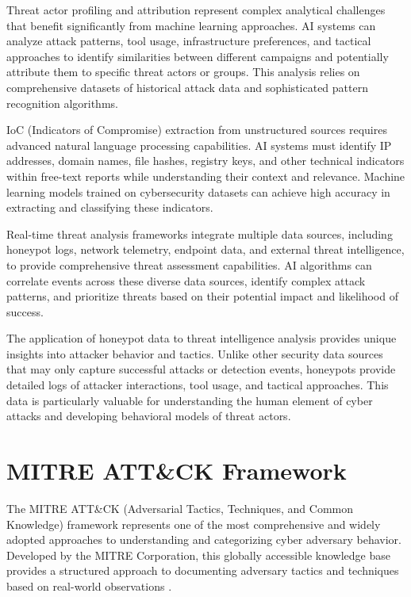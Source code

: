 Threat actor profiling and attribution represent complex analytical challenges that benefit significantly from machine learning approaches. AI systems can analyze attack patterns, tool usage, infrastructure preferences, and tactical approaches to identify similarities between different campaigns and potentially attribute them to specific threat actors or groups. This analysis relies on comprehensive datasets of historical attack data and sophisticated pattern recognition algorithms.

IoC (Indicators of Compromise) extraction from unstructured sources requires advanced natural language processing capabilities. AI systems must identify IP addresses, domain names, file hashes, registry keys, and other technical indicators within free-text reports while understanding their context and relevance. Machine learning models trained on cybersecurity datasets can achieve high accuracy in extracting and classifying these indicators.

Real-time threat analysis frameworks integrate multiple data sources, including honeypot logs, network telemetry, endpoint data, and external threat intelligence, to provide comprehensive threat assessment capabilities. AI algorithms can correlate events across these diverse data sources, identify complex attack patterns, and prioritize threats based on their potential impact and likelihood of success.

The application of honeypot data to threat intelligence analysis provides unique insights into attacker behavior and tactics. Unlike other security data sources that may only capture successful attacks or detection events, honeypots provide detailed logs of attacker interactions, tool usage, and tactical approaches. This data is particularly valuable for understanding the human element of cyber attacks and developing behavioral models of threat actors.

\section{MITRE ATT\&CK Framework}

The MITRE ATT\&CK (Adversarial Tactics, Techniques, and Common Knowledge) framework represents one of the most comprehensive and widely adopted approaches to understanding and categorizing cyber adversary behavior. Developed by the MITRE Corporation, this globally accessible knowledge base provides a structured approach to documenting adversary tactics and techniques based on real-world observations \cite{gizzarelli2024}.

